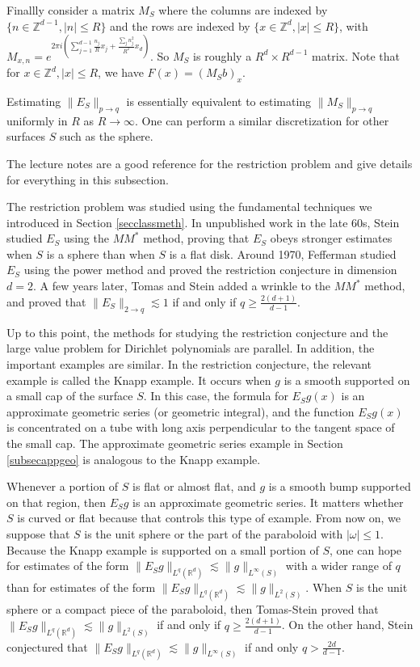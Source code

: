 \documentclass{amsart}
\newcommand{\ZZ}{\mathbb{Z}}
\newcommand{\RR}{\mathbb{R}}
\begin{document}
Finallly consider a matrix $M_S$ where the columns are indexed by $\{ n \in \ZZ^{d-1}, |n| \le R \}$ and the rows are indexed by $\{x \in \ZZ^d, |x| \le R \}$, with $M_{x,n} = e^{2 \pi i ( \sum_{j=1}^{d-1} \frac{n_j}{R} x_j + \frac{ \sum_j n_j^2}{R^2} x_d ) } . $ So $M_S$ is roughly a $R^d \times R^{d-1}$ matrix.  Note that for $x \in \ZZ^d, |x| \le R$, we have $F(x) = (M_S b)_x$.

Estimating $\| E_S \|_{p \rightarrow q}$ is essentially equivalent to estimating $\| M_S \|_{p \rightarrow q}$ uniformly in $R$ as $R \rightarrow \infty$.  One can perform a similar discretization for other surfaces $S$ such as the sphere.

The lecture notes \cite{T} are a good reference for the restriction problem and give details for everything in this subsection.  

The restriction problem was studied using the fundamental techniques we introduced in Section \ref{secclassmeth}.  In unpublished work in the late 60s, Stein studied $E_S$ using the $M M^*$ method, proving that $E_S$ obeys stronger estimates when $S$ is a sphere than when $S$ is a flat disk.  Around 1970, Fefferman \cite{F3} studied $E_S$ using the power method and proved the restriction conjecture in dimension $d=2$.  A few years later, Tomas and Stein added a wrinkle to the $M M^*$ method, and proved that $\| E_S \|_{2 \rightarrow q} \lesssim 1$ if and only if $q \ge \frac{2 (d+1)}{d-1}$.  

Up to this point, the methods for studying the restriction conjecture and the large value problem for Dirichlet polynomials are parallel.  In addition, the important examples are similar.  In the restriction conjecture, the relevant example is called the Knapp example.  It occurs when $g$ is a smooth supported on a small cap of the surface $S$.  In this case, the formula for $E_S g(x)$  is an approximate geometric series (or geometric integral), and the function $E_S g(x)$ is concentrated on a tube with long axis perpendicular to the tangent space of the small cap.  The approximate geometric series example in Section \ref{subsecappgeo} is analogous to the Knapp example.

Whenever a portion of $S$ is flat or almost flat, and $g$ is a smooth bump supported on that region, then $E_S g$ is an approximate geometric series.  It matters whether $S$ is curved or flat because that controls this type of example.  From now on, we suppose that $S$ is the unit sphere or the part of the paraboloid with $|\omega| \le 1$.  
  Because the Knapp example is supported on a small portion of $S$, one can hope for estimates of the form $\| E_S g \|_{L^q(\RR^d)} \lesssim \| g \|_{L^\infty(S)}$ with a wider range of $q$ than for estimates of the form $\| E_S g \|_{L^q(\RR^d)} \lesssim \| g \|_{L^2(S)}$.   When $S$ is the unit sphere or a compact piece of the paraboloid, then Tomas-Stein proved that $\| E_S g \|_{L^q(\RR^d)} \lesssim \| g \|_{L^2(S)}$ if and only if $q \ge \frac{2(d+1)}{d-1}$.  On the other hand, Stein conjectured that $\| E_S g \|_{L^q(\RR^d)} \lesssim \| g \|_{L^\infty(S)}$ if and only $q > \frac{2d}{d-1}$.  
\end{document}
